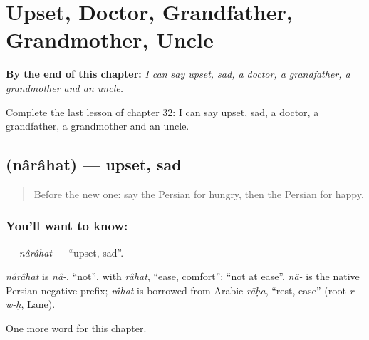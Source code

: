 
\chapter{Upset, Doctor, Grandfather, Grandmother, Uncle}
\label{ch:fa-upset-doctor-grandfather-grandmother-uncle}

\begin{chapteropening}
\textbf{By the end of this chapter:} \emph{I can say upset, sad, a doctor, a grandfather, a grandmother and an uncle.}

Complete the last lesson of chapter 32: I can say upset, sad, a doctor, a grandfather, a grandmother and an uncle.
\end{chapteropening}

\section[\texorpdfstring{\fa{ناراحت} (nârâhat)}{ناراحت (nârâhat)}]{ (nârâhat) — upset, sad}

\label{lesson:FA-C32-narahat}



\begin{quote}
Before the new one: say the Persian for hungry, then the Persian for happy.
\end{quote}

\subsection*{You'll want to know: }
\textbf{} — \emph{nârâhat} — \textquotedblleft{}upset, sad\textquotedblright{}.

\begin{cousinweb}
\emph{nârâhat} is \emph{nâ-}, \textquotedblleft{}not\textquotedblright{}, with \emph{râhat}, \textquotedblleft{}ease, comfort\textquotedblright{}: \textquotedblleft{}not at ease\textquotedblright{}. \emph{nâ-} is the native Persian negative prefix; \emph{râhat} is borrowed from Arabic \emph{rāḥa}, \textquotedblleft{}rest, ease\textquotedblright{} (root \emph{r-w-ḥ}, Lane).
\end{cousinweb}

\begin{grammarlens}[title={What you've built}]
One more word for this chapter.
\end{grammarlens}

